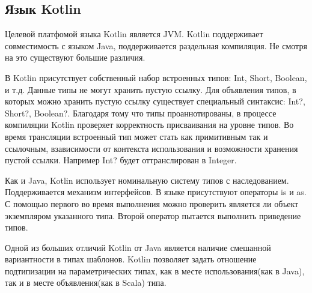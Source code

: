 \subsection{Язык Kotlin}

Целевой платфомой языка Kotlin является JVM. Kotlin поддерживает совместимость с языком Java\cite{kotlin:compatibility}, поддерживается раздельная компиляция. Не смотря на это существуют большие различия.

В Kotlin присутствует собственный набор встроенных типов: Int, Short, Boolean, и т.д. Данные типы не могут хранить пустую ссылку. Для объявления типов, в которых можно хранить пустую ссылку существует специальный синтаксис: Int?, Short?, Boolean?. Благодаря тому что типы проаннотированы, в процессе компиляции Kotlin проверяет корректность присваивания на уровне типов. Во время трансляции встроенный тип может стать как примитивным так и ссылочным, взависимости от контекста использования и возможности хранения пустой ссылки. Например Int? будет оттранслирован в Integer.

Как и Java, Kotlin использует номинальную систему типов с наследованием. Поддерживается механизм интерфейсов. В языке присутствуют операторы is и as. С помощью первого во время выполнения можно проверить является ли объект экземпляром указанного типа. Второй оператор пытается выполнить приведение типов.

Одной из больших отличий Kotlin от Java является наличие смешанной вариантности в типах шаблонов. Kotlin позволяет задать отношение подтипизации на параметрических типах, как в месте использования(как в Java), так и в месте объявления(как в Scala) типа.
